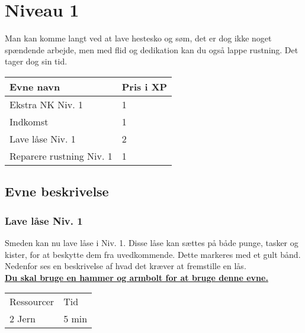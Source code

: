 \chapter{Niveau 1}
Man kan komme langt ved at lave hestesko og søm, det er dog ikke noget spændende arbejde, men med flid og dedikation kan du også lappe rustning. Det tager dog sin tid.
\begin{table}[H]
    \centering
    \begin{tabular}{|p{}|p{}|}
    \rowcolor{cerulean!80}\hline
        Evne navn & Pris i XP \\\hline
         Ekstra NK Niv. 1 & 1 \\\hline
         Indkomst & 1\\\hline
         Lave låse Niv. 1 & 2\\\hline
         Reparere rustning Niv. 1 & 1\\\hline
    \end{tabular}
\end{table}

\section{Evne beskrivelse}





\subsection{Lave låse Niv. 1}
Smeden kan nu lave låse i Niv. 1. Disse låse kan sættes på både punge, tasker og kister, for at beskytte dem fra uvedkommende. Dette markeres med et gult bånd.
Nedenfor ses en beskrivelse af hvad det kræver at fremstille en lås.\\
\textbf{\underline{Du skal bruge en hammer og armbolt for at bruge denne evne.}}

\begin{table}[H]
    \centering
    \begin{tabular}{|p{}|p{}|}
    \hline
    \rowcolor{cerulean!80}
    \multicolumn{2}{c}{Lås Niv. 1}\\
    \hline
    \rowcolor{cerulean!40}
         Ressourcer & Tid \\\hline
         2 Jern & 5 min\\\hline
    \end{tabular}
    \end{table}

